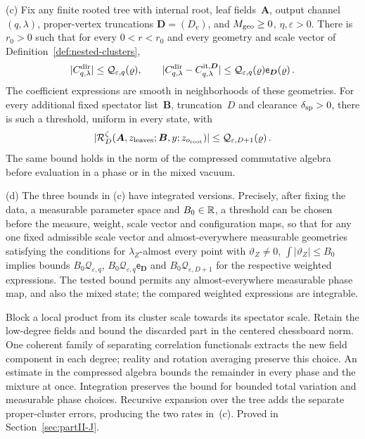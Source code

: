 \begin{proposition}
(c) Fix any finite rooted tree with internal root, leaf fields~$\boldsymbol A$, output channel~$(q,\lambda)$, proper-vertex truncations $\boldsymbol D=(D_v)$, and $M_{\rm geo}\ge0$, $\eta,\varepsilon>0$. There is $r_0>0$ such that for every $0<r<r_0$ and every geometry and scale vector of Definition~\ref{def:nested-clusters},
\begin{equation}\label{eq:P12-2}
|C^{\rm dir}_{q,\lambda}|\le \mathcal Q_{\varepsilon,q}(\varrho),\qquad
|C^{\rm dir}_{q,\lambda}-C^{\rm it,\boldsymbol D}_{q,\lambda}|\le \mathcal Q_{\varepsilon,q}(\varrho)\mathsf e_{\boldsymbol D}(\varrho)\,.
\end{equation}
The coefficient expressions are smooth in neighborhoods of these geometries. For every additional fixed spectator list~$\boldsymbol B$, truncation~$D$ and clearance $\delta_{\rm sp}>0$, there is such a threshold, uniform in every state, with
\begin{equation}\label{eq:P12-3}
|\mathcal R_D^\zeta(\boldsymbol A,z_{\rm leaves};\boldsymbol B,y;z_{o_{\rm root}})|\le \mathcal Q_{\varepsilon,D+1}(\varrho)\,.
\end{equation}
The same bound holds in the norm of the compressed commutative algebra before evaluation in a phase or in the mixed vacuum.

(d) The three bounds in (c) have integrated versions. Precisely, after fixing the data, a measurable parameter space and $B_0\in\mathbb{R}$, a threshold can be chosen before the measure, weight, scale vector and configuration maps, so that for any one fixed admissible scale vector and almost-everywhere measurable geometries satisfying the conditions for $\lambda_Z$-almost every point with $\vartheta_Z\ne0$, $\int|\vartheta_Z|\le B_0$ implies bounds $B_0\mathcal Q_{\varepsilon,q}$, $B_0\mathcal Q_{\varepsilon,q}\mathsf e_{\boldsymbol D}$ and $B_0\mathcal Q_{\varepsilon,D+1}$ for the respective weighted expressions. The tested bound permits any almost-everywhere measurable phase map, and also the mixed state; the compared weighted expressions are integrable.
\end{proposition}

Block a local product from its cluster scale towards its spectator scale.
Retain the low-degree fields and bound the discarded part in the centered
chessboard norm. One coherent family of separating correlation functionals
extracts the new field component in each degree; reality and rotation averaging
preserve this choice. An estimate in the compressed algebra bounds the
remainder in every phase and the mixture at once. Integration preserves the
bound for bounded total variation and measurable phase choices. Recursive
expansion over the tree adds the separate proper-cluster errors, producing
the two rates in~\textup{(c)}. Proved in Section~\ref{sec:partII-J}.

